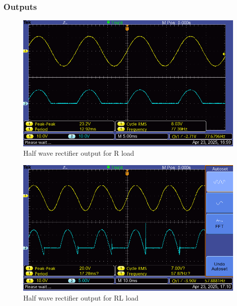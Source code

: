 \documentclass[12pt]{article}
\begin{document}
\subsubsection*{Outputs}
\begin{figure}[H]
    \centering
    \includegraphics[width=.7\textwidth]{half_r_load3.png}
    \caption{Half wave rectifier output for R load}
    \label{fig:rLoad}
\end{figure}

\begin{figure}[H]
    \centering
    \includegraphics[width=.7\textwidth]{half_rl_load4.png}
    \caption{Half wave rectifier output for RL load}
    \label{fig:rLoadDelay}
\end{figure}


\renewcommand{\bibname}{References}

\end{document}

